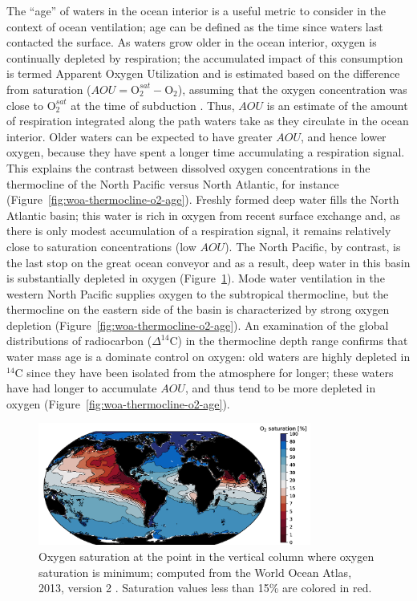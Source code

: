 \documentclass{report_chapter}
\begin{document}
The ``age'' of waters in the ocean interior is a useful metric to consider in the context of ocean ventilation; age can be defined as the time since waters last contacted the surface.
As waters grow older in the ocean interior, oxygen is continually depleted by respiration; the accumulated impact of this consumption is termed Apparent Oxygen Utilization and is estimated based on the difference from saturation ($AOU = \mathrm{O}_2^{sat} - \mathrm{O}_2$), assuming that the oxygen concentration was close to $\mathrm{O}_2^{sat}$ at the time of subduction \citep{Ito-Follows-etal-2004}.
Thus, $AOU$ is an estimate of the amount of respiration integrated along the path waters take as they circulate in the ocean interior.
Older waters can be expected to have greater $AOU$, and hence lower oxygen, because they have spent a longer time accumulating a respiration signal.
This explains the contrast between dissolved oxygen concentrations in the thermocline of the North Pacific versus North Atlantic, for instance (Figure~\ref{fig:woa-thermocline-o2-age}).
Freshly formed deep water fills the North Atlantic basin; this water is rich in oxygen from recent surface exchange and, as there is only modest accumulation of a respiration signal, it remains relatively close to saturation concentrations (low $AOU$).
The North Pacific, by contrast, is the last stop on the great ocean conveyor and as a result, deep water in this basin is substantially depleted in oxygen (Figure~\ref{fig:woa-o2-column-min}).
Mode water ventilation in the western North Pacific supplies oxygen to the subtropical thermocline, but the thermocline on the eastern side of the basin is characterized by strong oxygen depletion (Figure~\ref{fig:woa-thermocline-o2-age}).
An examination of the global distributions of radiocarbon ({$\Delta^{14}$C}) in the thermocline depth range confirms that water mass age is a dominate control on oxygen: old waters are highly depleted in {$^{14}$C} since they have been isolated from the atmosphere for longer; these waters have had longer to accumulate $AOU$, and thus tend to be more depleted in oxygen (Figure~\ref{fig:woa-thermocline-o2-age}).

\begin{figure}[tbp]
\centering
\includegraphics[width=0.8\textwidth]{woa-column-min-o2-sat.png}
\caption{Oxygen saturation at the point in the vertical column where oxygen saturation is minimum; computed from the World Ocean Atlas, 2013, version 2 \protect\citep{Garcia-Locarnini-etal-2014}.
Saturation values less than 15\% are colored in red.}
\label{fig:woa-o2-column-min}
\end{figure}
\end{document}
